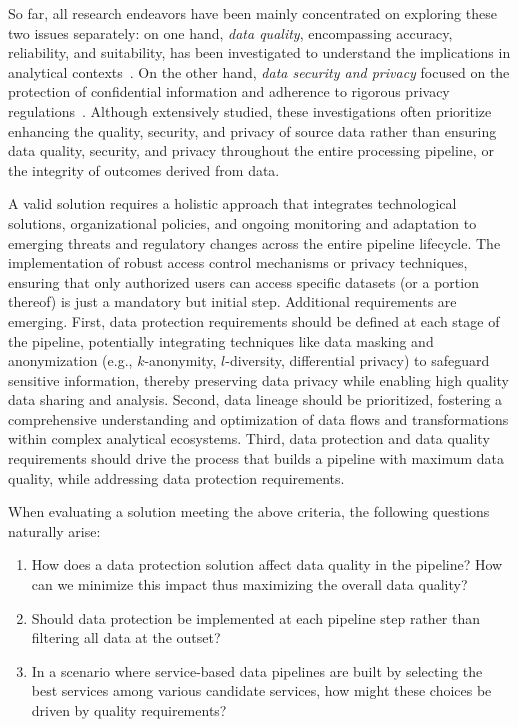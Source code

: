 So far, all research endeavors have been mainly concentrated on exploring these two issues separately: on one hand, \emph{data quality}, encompassing accuracy, reliability, and suitability, has been investigated to understand the implications in analytical contexts~\cite{Wang2023}.  On the other hand, \emph{data security and privacy} focused on the protection of confidential information and adherence to rigorous privacy regulations~\cite{palanisamy2020survey,thambiraja2012survey,woodruff1997supporting,gdpr}. {\color{OurColor}Although extensively studied, these investigations often prioritize enhancing the quality, security, and privacy of source data rather than ensuring data quality, security, and privacy throughout the entire processing pipeline, or the integrity of outcomes derived from data.}

A valid solution requires a holistic approach that integrates technological solutions, organizational policies, and ongoing monitoring and adaptation to emerging threats and regulatory changes {\color{OurColor}across the entire pipeline lifecycle.} The implementation of robust access control mechanisms or privacy techniques, ensuring that only authorized users can access specific datasets (or a portion thereof) is just a mandatory but initial step.
%
Additional requirements are emerging. First, data protection requirements should be defined at each stage of the {\color{OurColor}pipeline}, potentially integrating techniques like data masking and anonymization (e.g., $k$-anonymity, $l$-diversity, differential privacy) to safeguard sensitive information, thereby preserving data privacy while enabling high quality data sharing and analysis. Second, data lineage should be prioritized, fostering a comprehensive understanding and optimization of data flows and transformations within complex analytical ecosystems. {\color{OurColor}Third, data protection and data quality requirements should drive the process that builds a pipeline with maximum data quality, while addressing data protection requirements.}

When evaluating a solution meeting the above criteria, the following questions naturally arise:
\begin{enumerate}
\item {\color{OurColor}How does a data protection solution affect data quality in the pipeline? How can we minimize this impact thus maximizing the overall data quality?}
\item Should data protection be implemented at each pipeline step rather than filtering all data at the outset?
\item {\color{OurColor}In a scenario where service-based data pipelines are built by selecting the best services among various candidate services, how might these choices be driven by quality requirements?}
\end{enumerate}

